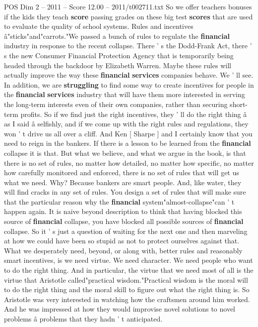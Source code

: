 \begin{textsample}{POS Dim 2 – 2011 – Score 12.00 – 2011/t002711.txt}
So we offer teachers bonuses if the kids they teach \textbf{score} passing grades on these big test \textbf{scores} that are used to evaluate the quality of school systems.
Rules and incentives â"sticks"and"carrots."We passed a bunch of rules to regulate the \textbf{financial} industry in response to the recent collapse.
There ' s the Dodd-Frank Act, there ' s the new Consumer Financial Protection Agency that is temporarily being headed through the backdoor by Elizabeth Warren.
Maybe these rules will actually improve the way these \textbf{financial} \textbf{services} companies behave.
We ' ll see.
In addition, we are \textbf{struggling} to find some way to create incentives for people in the \textbf{financial} \textbf{services} industry that will have them more interested in serving the long-term interests even of their own companies, rather than securing short-term profits.
So if we find just the right incentives, they ' ll do the right thing â as I said â selfishly, and if we come up with the right rules and regulations, they won ' t drive us all over a cliff.
And Ken [ Sharpe ] and I certainly know that you need to reign in the bankers.
If there is a lesson to be learned from the \textbf{financial} collapse it is that.
But what we believe, and what we argue in the book, is that there is no set of rules, no matter how detailed, no matter how specific, no matter how carefully monitored and enforced, there is no set of rules that will get us what we need.
Why?
Because bankers are smart people.
And, like water, they will find cracks in any set of rules.
You design a set of rules that will make sure that the particular reason why the \textbf{financial} system"almost-collapse"can ' t happen again.
It is naive beyond description to think that having blocked this source of \textbf{financial} collapse, you have blocked all possible sources of \textbf{financial} collapse.
So it ' s just a question of waiting for the next one and then marveling at how we could have been so stupid as not to protect ourselves against that.
What we desperately need, beyond, or along with, better rules and reasonably smart incentives, is we need virtue.
We need character.
We need people who want to do the right thing.
And in particular, the virtue that we need most of all is the virtue that Aristotle called"practical wisdom."Practical wisdom is the moral will to do the right thing and the moral skill to figure out what the right thing is.
So Aristotle was very interested in watching how the craftsmen around him worked.
And he was impressed at how they would improvise novel solutions to novel problems â problems that they hadn ' t anticipated.

\end{textsample}
